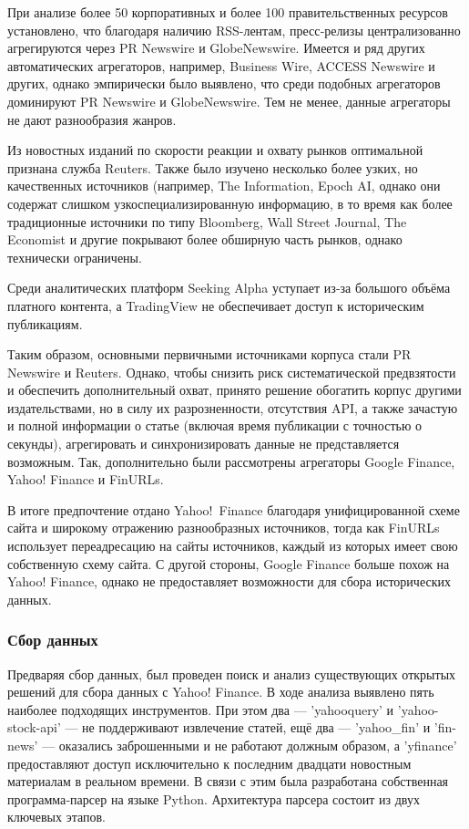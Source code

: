 При анализе более 50 корпоративных и более 100 правительственных ресурсов установлено,
что благодаря наличию RSS-лентам, пресс‑релизы централизованно агрегируются через PR Newswire
и GlobeNewswire. Имеется и ряд других автоматических агрегаторов, например,
Business Wire,
ACCESS Newswire и других, однако эмпирически было выявлено, что среди подобных агрегаторов
доминируют PR Newswire и GlobeNewswire. Тем не менее, данные агрегаторы не дают разнообразия жанров.

Из новостных изданий по скорости реакции и охвату рынков оптимальной признана служба Reuters.
Также было изучено несколько более узких, но качественных источников (например, The Information,
Epoch AI, однако они содержат слишком узкоспециализированную информацию, в то время как более
традиционные источники по типу Bloomberg, Wall Street Journal,
The Economist и другие покрывают более обширную часть рынков, однако технически ограничены.

Среди аналитических платформ Seeking Alpha уступает из‑за большого объёма платного контента,
а TradingView не обеспечивает доступ к историческим публикациям.

Таким образом, основными первичными источниками корпуса стали PR Newswire и Reuters. Однако, чтобы снизить риск
систематической предвзятости и обеспечить дополнительный охват, принято решение обогатить корпус другими
издательствами, но в силу их разрозненности, отсутствия API, а также зачастую и полной информации о статье
(включая время публикации с точностью о секунды), агрегировать и синхронизировать данные не представляется возможным.
Так, дополнительно были рассмотрены агрегаторы Google Finance,
Yahoo! Finance и FinURLs.

В итоге предпочтение отдано Yahoo! Finance благодаря унифицированной схеме сайта и широкому отражению разнообразных
источников, тогда как FinURLs использует переадресацию на сайты источников, каждый из которых имеет свою собственную
схему сайта. С другой стороны, Google Finance больше похож на Yahoo! Finance, однако не предоставляет возможности
для сбора исторических данных.


\subsubsection{Сбор данных}
\label{sec:data_collecting}

Предваряя сбор данных, был проведен поиск и анализ существующих открытых решений для сбора данных
с Yahoo! Finance. В ходе анализа выявлено пять наиболее подходящих инструментов. При этом два --- 'yahooquery'
и 'yahoo-stock-api' --- не поддерживают извлечение статей, ещё два --- 'yahoo\_fin' и 'fin-news' --- оказались
заброшенными и не работают должным образом, а 'yfinance' предоставляют доступ исключительно к последним двадцати
новостным материалам в реальном времени. В связи с этим была разработана собственная программа‑парсер на языке Python.
Архитектура парсера состоит из двух ключевых этапов.

